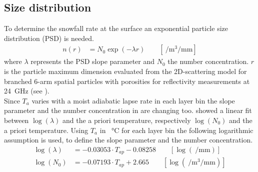 \subsection{Size distribution} \label{sec:size_dist}
To determine the snowfall rate at the surface an exponential particle size distribution (PSD) is needed. 
\begin{align}
	n(r) & = N_{0} \exp\left(-\lambda r\right) \qquad [ \SI{}{\per\cubic\metre\per\mm} ] \label{eq:num_dens}
\end{align}
where $\lambda$ represents the PSD slope parameter and $N_{0}$ the number concentration. $r$ is the particle maximum dimension evaluated from the 2D-scattering model for branched 6-arm spatial particles with porosities for reflectivity measurements at \SI{24}{\giga\Hz} (see ).
\\
Since $T_{a}$ varies with a moist adiabatic lapse rate in each layer bin the slope parameter and the number concentration in  are changing too. \cite{wood_estimation_2011} showed a linear fit between $\log(\lambda)$ and the a priori temperature, respectively $\log(N_0)$ and the a priori temperature.
Using $T_{a}$ in \SI{}{\celsius} for each layer bin the following logarithmic assumption is used, to define the slope parameter and the number concentration.
\begin{align}
	\log(\lambda) & = -0.03053 \cdot T_{ap} - 0.08258  \label{eq:lambda} \qquad [ \log(\SI{}{\per\mm}) ]\\
	\log(N_0) & = -0.07193 \cdot T_{ap} +2.665  \qquad [ \log(\SI{}{\per\cubic\metre\per\mm})]
	\label{eq:N0}
\end{align}
